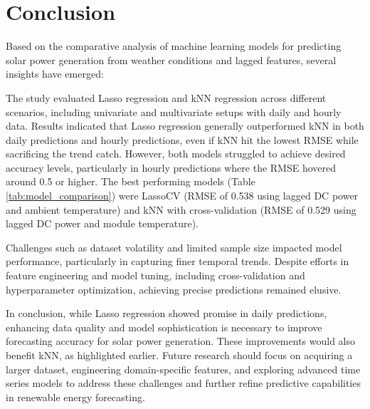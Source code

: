 \section{Conclusion}
Based on the comparative analysis of machine learning models for predicting solar power generation from weather conditions and lagged features, several insights have emerged:

The study evaluated Lasso regression and kNN regression across different scenarios, including univariate and multivariate setups with daily and hourly data. Results indicated that Lasso regression generally outperformed kNN in both daily predictions and hourly predictions, even if kNN hit the lowest RMSE while sacrificing the trend catch. However, both models struggled to achieve desired accuracy levels, particularly in hourly predictions where the RMSE hovered around 0.5 or higher. The best performing models (Table \ref{tab:model_comparison}) were LassoCV (RMSE of 0.538 using lagged DC power and ambient temperature) and kNN with cross-validation (RMSE of 0.529 using lagged DC power and module temperature).

Challenges such as dataset volatility and limited sample size impacted model performance, particularly in capturing finer temporal trends. Despite efforts in feature engineering and model tuning, including cross-validation and hyperparameter optimization, achieving precise predictions remained elusive.

In conclusion, while Lasso regression showed promise in daily predictions, enhancing data quality and model sophistication is necessary to improve forecasting accuracy for solar power generation. These improvements would also benefit kNN, as highlighted earlier. Future research should focus on acquiring a larger dataset, engineering domain-specific features, and exploring advanced time series models to address these challenges and further refine predictive capabilities in renewable energy forecasting.